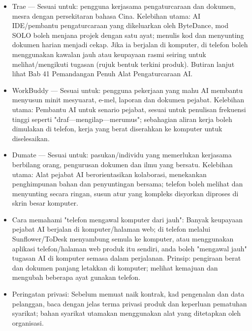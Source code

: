 \begin{itemize}
  \item Trae — Sesuai untuk: pengguna kerjasama pengaturcaraan dan dokumen, mesra dengan persekitaran bahasa Cina. Kelebihan utama: AI IDE/pembantu pengaturcaraan yang dikeluarkan oleh ByteDance, mod SOLO boleh menjana projek dengan satu ayat; menulis kod dan menyunting dokumen harian menjadi cekap. Jika ia berjalan di komputer, di telefon boleh menggunakan kawalan jauh atau keupayaan rasmi seiring untuk melihat/mengikuti tugasan (rujuk bentuk terkini produk). Butiran lanjut lihat Bab 41 Pemandangan Penuh Alat Pengaturcaraan AI.
  \item WorkBuddy — Sesuai untuk: pengguna pekerjaan yang mahu AI membantu menyusun minit mesyuarat, e-mel, laporan dan dokumen pejabat. Kelebihan utama: Pembantu AI untuk senario pejabat, sesuai untuk penulisan frekuensi tinggi seperti "draf—mengilap—merumus"; sebahagian aliran kerja boleh dimulakan di telefon, kerja yang berat diserahkan ke komputer untuk diselesaikan.
  \item Dumate — Sesuai untuk: pasukan/individu yang memerlukan kerjasama berbilang orang, pengurusan dokumen dan ilmu yang bersatu. Kelebihan utama: Alat pejabat AI berorientasikan kolaborasi, menekankan penghimpunan bahan dan penyuntingan bersama; telefon boleh melihat dan menyunting secara ringan, susun atur yang kompleks disyorkan diproses di skrin besar komputer.
  \item Cara memahami "telefon mengawal komputer dari jauh": Banyak keupayaan pejabat AI berjalan di komputer/halaman web; di telefon melalui Sunflower/ToDesk menyambung semula ke komputer, atau menggunakan aplikasi telefon/halaman web produk itu sendiri, anda boleh "mengawal jauh" tugasan AI di komputer semasa dalam perjalanan. Prinsip: pengiraan berat dan dokumen panjang letakkan di komputer; melihat kemajuan dan mengubah beberapa ayat gunakan telefon.
  \item Peringatan privasi: Sebelum memuat naik kontrak, kad pengenalan dan data pelanggan, baca dengan jelas terma privasi produk dan keperluan pematuhan syarikat; bahan syarikat utamakan menggunakan alat yang ditetapkan oleh organisasi.
\end{itemize}


